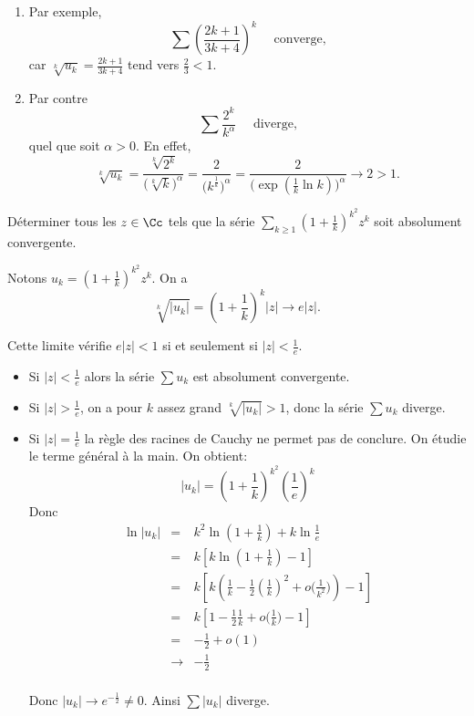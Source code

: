 \documentclass[class=report,crop=false]{standalone}
\begin{document}
\begin{exemple}
\begin{enumerate}
  \item Par exemple, 
$$\sum \left(\frac{2k+1}{3k+4}\right)^k\quad \text{ converge,}$$
car $\sqrt[k]{u_k} = \frac{2k+1}{3k+4}$ tend vers $\frac{2}{3}<1$.
  
  
  \item Par contre  
  $$\sum \frac{2^k}{k^\alpha}\quad \text{ diverge,}$$
  quel que soit $\alpha >0$.
  En effet,
  $$\sqrt[k]{u_k} = \frac{\sqrt[k]{2^k}}{\big(\sqrt[k]{k}\big)^\alpha}
  = \frac{2}{\big(k^\frac{1}{k}\big)^\alpha}
  = \frac{2}{\big(\exp(\frac{1}{k}\ln k)\big)^\alpha} \to 2>1.$$
\end{enumerate}
\end{exemple}


\begin{exemple}
Déterminer tous les $z\in \Cc$ tels que la série  
$\sum_{k\ge1} \left( 1+\frac{1}{k}\right)^{k^2} z^k$ soit absolument convergente.
\medskip

Notons $u_k =\left( 1+\frac{1}{k}\right)^{k^2} z^k$.
On a $$\sqrt[k]{|u_k|}=\left( 1+\frac{1}{k}\right)^k |z| \to e|z|.$$

Cette limite vérifie $e|z| < 1$ si et seulement si $|z|<\frac{1}{e}$.

\begin{itemize}
  \item Si $|z|<\frac{1}{e}$ alors la série $\sum u_k$ est absolument 
convergente.
  
  \item Si $|z|>\frac{1}{e}$, on a pour $k$ assez grand
  $\sqrt[k]{|u_k|}>1$, donc la série $\sum u_k$ diverge.
  
  \item Si $|z|=\frac{1}{e}$ la règle des racines de Cauchy ne permet pas de conclure.
  On étudie le terme général à la main.
  On obtient:
  $$|u_k|=\left(  1+\frac{1}{k}\right)^{k^2}\left(\frac{1}{e}\right)^k$$
  Donc
  \begin{eqnarray*}
  \ln|u_k| 
  & = & k^2\ln\left(1+\tfrac{1}{k}\right)+k\ln \tfrac{1}{e} \\
  & = & k\left[k\ln (1+\tfrac{1}{k})-1\right] \\
  & = & k \left[ k\left(\tfrac{1}{k}-\tfrac{1}{2}\left( \tfrac{1}{k}\right)^2+
o\big( \tfrac{1}{k^2}\big) \right)-1\right] \\
  & = & k\left[1-\tfrac{1}{2}\tfrac{1}{k}+o\big( \tfrac{1}{k}\big) -1\right] \\
  & = & -\tfrac{1}{2} +o(1) \\
  & \to & -\tfrac{1}{2}\\
  \end{eqnarray*}

Donc $|u_k| \to e^{-\frac{1}{2}}\neq 0$. Ainsi $\sum |u_k|$ diverge. 
\end{itemize}

\end{exemple}
\end{document}

